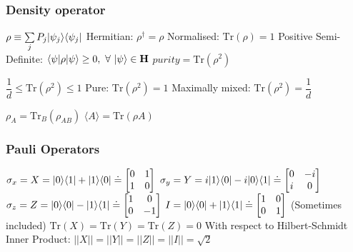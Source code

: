 \subsubsection{Density operator}
\begin{itemize}
\itemt \( \rho \equiv \sum\limits_{j} P_j \lvert\psi_j\rangle\langle\psi_j\rvert \)
\itemt Hermitian: \( \rho^\dagger = \rho \)
\itemt Normalised: \( \mathrm{Tr} (\rho) = 1 \)
\itemt Positive Semi-Definite: \( \bra{\psi}\rho\ket{\psi} \geq 0, \ \forall \ \ket{\psi} \in \mathbf{H} \)
\itemt \( purity = \mathrm{Tr} (\rho^2) \)
	\begin{itemize}
	\itemt \( \dfrac{1}{d} \leq \mathrm{Tr} (\rho^2) \leq 1 \)
	\itemt Pure: \( \mathrm{Tr} (\rho^2) = 1 \)
	\itemt Maximally mixed: \( \mathrm{Tr} (\rho^2) = \dfrac{1}{d} \)
	\end{itemize}
\itemt \( \rho_A = \mathrm{Tr}_B(\rho_{AB}) \)
\itemt \( \langle A\rangle = \mathrm{Tr} (\rho A) \)
\end{itemize}				

\subsubsection{Pauli Operators}
\begin{itemize}
\itemt \( \sigma_x = X = \lvert0\rangle\langle1\rvert + \lvert1\rangle\langle0\rvert \doteq 		
\begin{bmatrix}
0 & 1 \\
1 & 0
\end{bmatrix} \)					
\itemt \( \sigma_y = Y = i\lvert1\rangle\langle0\rvert - i\lvert0\rangle\langle1\rvert \doteq 
\begin{bmatrix}
0 & -i \\
i & 0
\end{bmatrix} \)					
\itemt \( \sigma_z = Z = \lvert0\rangle\langle0\rvert - \lvert1\rangle\langle1\rvert \doteq 
\begin{bmatrix}
1 & 0 \\
0 & -1
\end{bmatrix} \)					
\itemt \( I = \lvert0\rangle\langle0\rvert + \lvert1\rangle\langle1\rvert \doteq \begin{bmatrix}
1 & 0 \\
0 & 1
\end{bmatrix} \) (Sometimes included)					
\itemt \( \mathrm{Tr} (X) = \mathrm{Tr} (Y) = \mathrm{Tr} (Z) = 0 \)					
\itemt With respect to Hilbert-Schmidt Inner Product:
\subitem \( ||X|| = ||Y|| = ||Z|| = ||I|| = \sqrt{2} \)				
\end{itemize}

